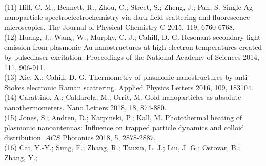 \documentclass[10pt]{article}
\begin{document}
(11) Hill, C. M.; Bennett, R.; Zhou, C.; Street, S.; Zheng, J.; Pan, S. Single Ag nanoparticle spectroelectrochemistry via dark-field scattering and fluorescence microscopies. The Journal of Physical Chemistry C 2015, 119, 6760-6768.\\
(12) Huang, J.; Wang, W.; Murphy, C. J.; Cahill, D. G. Resonant secondary light emission from plasmonic Au nanostructures at high electron temperatures created by pulsedlaser excitation. Proceedings of the National Academy of Sciences 2014, 111, 906-911.\\
(13) Xie, X.; Cahill, D. G. Thermometry of plasmonic nanostructures by anti-Stokes electronic Raman scattering. Applied Physics Letters 2016, 109, 183104.\\
(14) Carattino, A.; Caldarola, M.; Orrit, M. Gold nanoparticles as absolute nanothermometers. Nano Letters 2018, 18, 874-880.\\
(15) Jones, S.; Andren, D.; Karpinski, P.; Kall, M. Photothermal heating of plasmonic nanoantennas: Influence on trapped particle dynamics and colloid distribution. $A C S$ Photonics 2018, 5, 2878-2887.\\
(16) Cai, Y.-Y.; Sung, E.; Zhang, R.; Tauzin, L. J.; Liu, J. G.; Ostovar, B.; Zhang, Y.;
\end{document}
